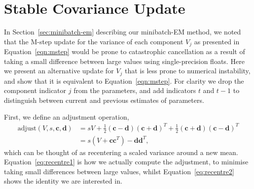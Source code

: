 \documentclass{article}
\newcommand{\bc}{\mathbf{c}}
\newcommand{\bd}{\mathbf{d}}
\begin{document}
%
%



\appendix

\section{Stable Covariance Update}
\label{apx:variance-rewrite}

In Section~\ref{sec:minibatch-em} describing our minibatch-EM method, we noted that the M-step update for the variance of each component $V_j$ as presented in Equation~\ref{eqn:mstep} would be prone to catastrophic cancellation as a result of taking a small difference between large values using single-precision floats.
Here we present an alternative update for $V_j$ that is less prone to numerical instability, and show that it is equivalent to Equation~\ref{eqn:mstep}.
For clarity we drop the component indicator $j$ from the parameters, and add indicators $t$ and $t-1$ to distinguish between current and previous estimates of parameters.

First, we define an adjustment operation,
\begin{align}
  \text{adjust}(V, s, \bc, \bd) &= sV + \frac{1}{2}(\bc - \bd)(\bc + \bd)^T + \frac{1}{2}(\bc + \bd)(\bc - \bd)^T  \label{eq:recentre1} \\
  &= s(V + \bc\bc^T) - \bd\bd^T,\label{eq:recentre2}
\end{align}
which can be thought of as recentering a scaled variance around a new mean.
Equation~\ref{eq:recentre1} is how we actually compute the adjustment, to minimise taking small differences between large values, whilst Equation~\ref{eq:recentre2} shows the identity we are interested in.
\end{document}
